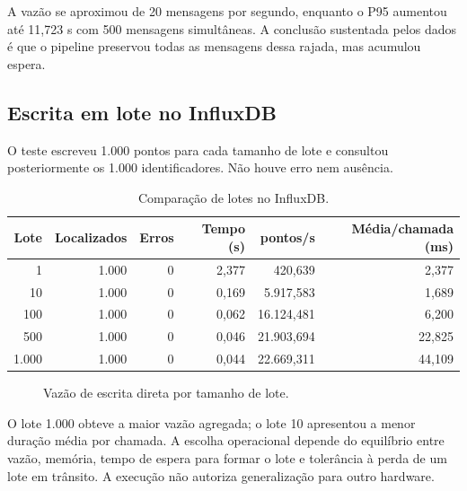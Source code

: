 \documentclass[12pt,a4paper]{article}
\begin{document}
A vazão se aproximou de 20 mensagens por segundo, enquanto o P95 aumentou até 11,723 s com 500 mensagens simultâneas. A conclusão sustentada pelos dados é que o pipeline preservou todas as mensagens dessa rajada, mas acumulou espera.

\subsection{Escrita em lote no InfluxDB}

O teste escreveu 1.000 pontos para cada tamanho de lote e consultou posteriormente os 1.000 identificadores. Não houve erro nem ausência.

\begin{table}[htbp]
\centering
\caption{Comparação de lotes no InfluxDB.}
\begin{tabular}{rrrrrr}
\toprule
Lote & Localizados & Erros & Tempo (s) & pontos/s & Média/chamada (ms) \\
\midrule
1 & 1.000 & 0 & 2,377 & 420,639 & 2,377 \\
10 & 1.000 & 0 & 0,169 & 5.917,583 & 1,689 \\
100 & 1.000 & 0 & 0,062 & 16.124,481 & 6,200 \\
500 & 1.000 & 0 & 0,046 & 21.903,694 & 22,825 \\
1.000 & 1.000 & 0 & 0,044 & 22.669,311 & 44,109 \\
\bottomrule
\end{tabular}
\end{table}

\begin{figure}[htbp]
\centering
{}
\caption{Vazão de escrita direta por tamanho de lote.}
\end{figure}

O lote 1.000 obteve a maior vazão agregada; o lote 10 apresentou a menor duração média por chamada. A escolha operacional depende do equilíbrio entre vazão, memória, tempo de espera para formar o lote e tolerância à perda de um lote em trânsito. A execução não autoriza generalização para outro hardware.
\end{document}
